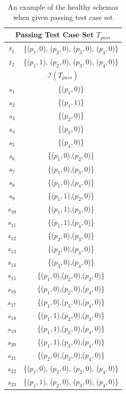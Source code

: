 \begin{table}[htbp]
  \centering
  \caption{An example of the healthy schemas when given passing test case set}
      \label{ex:wholesetofhealthyschemas}
    \begin{tabular}{|c|c|} \hline
   \multicolumn{2}{|c|}{\textbf{Passing Test Case Set $T_{pass}$}} \\ \hline
   $t_{1}$ & \{($p_{1}, 0$), ($p_{2}, 0$), ($p_{3}, 0$), ($p_{4}, 0$)\} \\
   $t_{2}$ & \{($p_{1}, 1$), ($p_{2}, 0$), ($p_{3}, 0$), ($p_{4}, 0$)\} \\ \hline
    \multicolumn{2}{|c|}{\textbf{ $\mathcal{I}(T_{pass})$ }}\\ \hline
   $s_{1}$ & \{($p_{1}, 0$)\} \\
   $s_{2}$ & \{($p_{1}, 1$)\} \\
   $s_{3}$ & \{($p_{2}, 0$)\} \\
   $s_{4}$ & \{($p_{3}, 0$)\} \\
   $s_{5}$ & \{($p_{4}, 0$)\} \\

   $s_{6}$ & \{($p_{1}, 0$),($p_{2}, 0$)\} \\
   $s_{7}$ & \{($p_{1}, 0$),($p_{3}, 0$)\} \\
   $s_{8}$ & \{($p_{1}, 0$),($p_{4}, 0$)\} \\


   $s_{9}$ & \{($p_{1}, 1$),($p_{2}, 0$)\} \\
   $s_{10}$ & \{($p_{1}, 1$),($p_{3}, 0$)\} \\
   $s_{11}$ & \{($p_{1}, 1$),($p_{4}, 0$)\} \\
   $s_{12}$ & \{($p_{2}, 0$),($p_{3}, 0$)\} \\
   $s_{13}$ & \{($p_{2}, 0$),($p_{4}, 0$)\} \\
   $s_{14}$ & \{($p_{3}, 0$),($p_{4}, 0$)\} \\

   $s_{15}$ & \{($p_{1}, 0$),($p_{2}, 0$),($p_{3}, 0$)\} \\
   $s_{16}$ & \{($p_{1}, 0$),($p_{2}, 0$),($p_{4}, 0$)\} \\
   $s_{17}$ & \{($p_{1}, 0$),($p_{3}, 0$),($p_{4}, 0$)\} \\

   $s_{18}$ & \{($p_{1}, 1$),($p_{2}, 0$),($p_{3}, 0$)\} \\
   $s_{19}$ & \{($p_{1}, 1$),($p_{2}, 0$),($p_{4}, 0$)\} \\
   $s_{20}$ & \{($p_{1}, 1$),($p_{3}, 0$),($p_{4}, 0$)\} \\

   $s_{21}$ & \{($p_{2}, 0$),($p_{3}, 0$),($p_{4}, 0$)\} \\

   $s_{22}$ & \{($p_{1}, 0$), ($p_{2}, 0$), ($p_{3}, 0$), ($p_{4}, 0$)\} \\
   $s_{23}$ & \{($p_{1}, 1$), ($p_{2}, 0$), ($p_{3}, 0$), ($p_{4}, 0$)\} \\  \hline
    \end{tabular}%
\end{table}%


